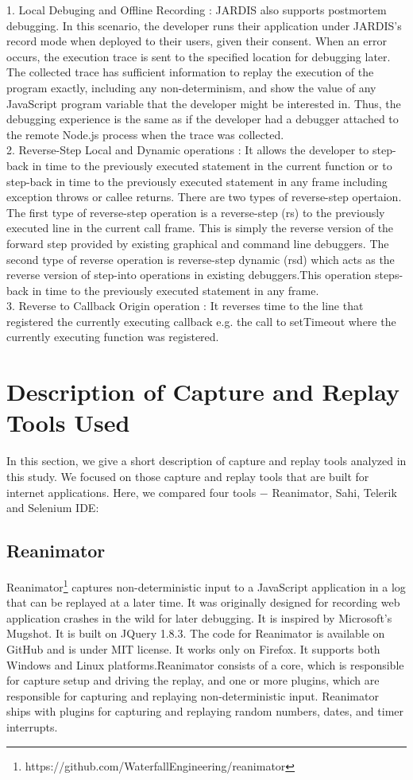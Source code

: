 \documentclass[12pt,journal]{IEEEtran}
\begin{document}
1.	Local Debuging and Offline Recording :  JARDIS also supports postmortem debugging. In this scenario, the developer runs their application under JARDIS’s record mode when deployed to their users, given their consent. When an error occurs, the execution trace is sent to the specified location for debugging later. The collected trace has sufficient information to replay the execution of the program exactly, including any non-determinism, and show the value of any JavaScript program variable that the developer might be interested in. Thus, the debugging experience is the same as if the developer had a debugger attached to the remote Node.js process when the trace was collected.\\
2.	Reverse-Step Local and Dynamic operations : It allows the developer to step-back in time to the previously executed statement in the current function or to step-back in time to the previously executed statement in any frame including exception throws or callee returns.  There are two types of reverse-step opertaion. The first type of reverse-step operation is a reverse-step (rs) to the previously executed line in the current call frame. This is simply the reverse version of the forward step provided by existing graphical and command line debuggers. The second type of reverse operation is reverse-step dynamic (rsd) which acts as the reverse version of step-into operations in existing debuggers.This operation steps-back in time to the previously executed statement in any frame.\\
3.	Reverse to Callback Origin operation : It reverses time to the line that registered the currently executing callback e.g. the call to setTimeout where the currently executing function was registered.



\section{Description of Capture and Replay Tools Used}
In this section, we give a short description of capture and replay tools analyzed in this study. We focused on those capture and replay tools that are built for internet applications. Here, we compared four tools $-$ Reanimator, Sahi, Telerik and Selenium IDE:
\subsection{Reanimator}
Reanimator\footnote{https://github.com/WaterfallEngineering/reanimator} captures non-deterministic input to a JavaScript application in a log that can be replayed at a later time. It was originally designed for recording web application crashes in the wild for later debugging. It is inspired by Microsoft’s Mugshot. It is built on JQuery 1.8.3. The code for Reanimator is available on GitHub and is under MIT license. It works only on Firefox. It supports both Windows and Linux platforms.Reanimator consists of a core, which is responsible for capture setup and driving the replay, and one or more plugins, which are responsible for capturing and replaying non-deterministic input. Reanimator ships with plugins for capturing and replaying random numbers, dates, and timer interrupts.
\end{document}
